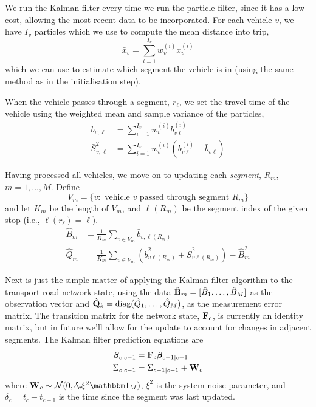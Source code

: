 \documentclass[draftcls,a4paper,onecolumn]{IEEEtran}\usepackage[]{graphicx}\usepackage[]{color}
\begin{document}
We run the Kalman filter every time we run the particle filter,
since it has a low cost, allowing the most recent data to be incorporated.
For each vehicle $v$, we have $I_v$ particles which we use to
compute the mean distance into trip,
\begin{equation}
  \label{eq:weighted_mean}
  \bar x_v = \sum_{i=1}^{I_v} w_v^{(i)} x_v^{(i)}
\end{equation}
which we can use to estimate which segment the vehicle is in
(using the same method as in the initialisation step).

When the vehicle passes through a segment, $r_\ell$,
we set the travel time of the vehicle using the 
weighted mean and sample variance of the particles,
\begin{align}
  \label{eq:weighted_travel}
  \bar b_{v,\ell} &= \sum_{i=1}^{I_v} w_v^{(i)} b_{v\ell}^{(i)} \\
  \bar S_{v,\ell}^2 &= \sum_{i=1}^{I_v} w_v^{(i)}(b_{v\ell}^{(i)} - \bar b_{v\ell})
\end{align}


Having processed all vehicles, we move on to updating each \emph{segment},
$R_m$, $m = 1, \ldots, M$.
Define
\begin{equation*}
  V_m = \{v:\text{ vehicle $v$ passed through segment } R_m\}
\end{equation*}
and let $K_m$ be the length of $V_m$,
and $\ell(R_m)$ be the segment index of the given stop
(i.e., $\ell(r_\ell) = \ell$).
\begin{align}
  \label{eq:kf_data_estimates}
  \hat B_m &= \frac{1}{K_m} \sum_{v \in V_m} \bar b_{v,\ell(R_m)}  \\
  \hat Q_m &= \frac{1}{K_m} \sum_{v \in V_m} 
  \left(\bar b_{v\ell(R_m)}^2 + \bar S_{v\ell(R_m)}^2\right) - \hat B_m^2
\end{align}

Next is just the simple matter of applying the Kalman filter algorithm 
\cite{Anderson_2012} 
to the transport road network state,
using the data \mbox{$\hat {\mathbf{B}}_m = [\hat B_1, \ldots, \hat B_M]$} 
as the observation vector
and \mbox{$\hat {\mathbf{Q}}_k = \textrm{diag}(\hat Q_1, \ldots, \hat Q_M)$},
as the measurement error matrix.
The transition matrix for the network state, $\mathbf{F}_c$,
is currently an identity matrix,
but in future we'll allow for the update to account for
changes in adjacent segments.
The Kalman filter prediction equations are
\begin{align}
  \boldsymbol{\beta}_{c|c-1} &= \mathbf{F}_c\boldsymbol{\beta}_{c-1|c-1} \\
  \Sigma_{c|c-1} &= \Sigma_{c-1|c-1} + \mathbf{W}_c
\end{align}
where $\bW_c \sim \mathcal{N}(0, \delta_c\xi^2\eye_M)$, 
$\xi^2$ is the system noise parameter,
and $\delta_c = t_c - t_{c-1}$ is the time since the segment
was last updated.
\end{document}
